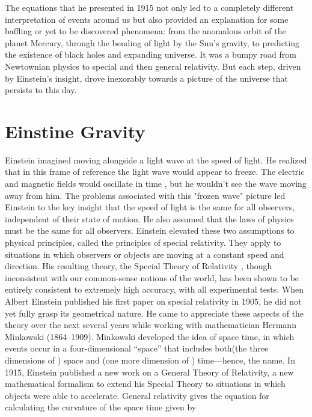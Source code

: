 The equations that he presented in 1915 not only led to a completely different interpretation of events around us but also provided an explanation for some baffling or yet to be discovered phenomena: from the anomalous orbit of the planet Mercury, through the bending of light by the Sun’s gravity, to predicting the existence of black holes and expanding universe.
It was a bumpy road from Newtownian physics to special and then general relativity. But each step, driven by Einstein’s insight, drove inexorably towards a picture of the universe that persists to this day.

\section{Einstine Gravity}

 Einstein imagined moving alongside a 
light wave at the speed of light. He realized that in this frame of reference the light wave 
would appear to freeze. The electric and magnetic fields would oscillate in time , but he 
wouldn't see the wave moving away from him. The problems associated with this "frozen 
wave" picture led Einstein to the key insight that the speed of light is the same for all 
observers, independent of their state of motion. He also assumed that the laws of physics 
must be the same for all observers.
Einstein elevated these two assumptions to physical principles, called the principles of
special relativity. They apply to situations in which observers or objects are moving at a 
constant speed and direction. His resulting theory, the Special Theory of Relativity , though 
inconsistent with our common-sense notions of the world, has been shown to be entirely 
consistent to extremely high accuracy, with all experimental tests. When Albert Einstein 
published his first paper on special relativity in 1905, he did not yet fully grasp its 
geometrical nature. He came to appreciate these aspects of the theory over the next several 
years while working with mathematician Hermann Minkowski (1864–1909). Minkowski 
developed the idea of space time, in which events occur in a four-dimensional “space” that 
includes both(the three dimensions of ) space and (one more dimension of ) time—hence, 
the name. 
In 1915, Einstein published a new work on a General Theory of Relativity, a new 
mathematical formalism to extend his Special Theory to situations in which objects were 
able to accelerate. General relativity gives the equation for calculating the curvature of the space time given by

